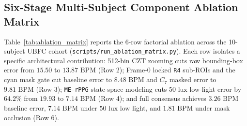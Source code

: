 \documentclass[conference]{IEEEtran}
\begin{document}
\subsection{Six-Stage Multi-Subject Component Ablation Matrix}

Table~\ref{tab:ablation_matrix} reports the 6-row factorial ablation across the 10-subject UBFC cohort (\texttt{scripts/run\_ablation\_matrix.py}). Each row isolates a specific architectural contribution: 512-bin CZT zooming cuts raw bounding-box error from $15.50$ to $13.87\text{ BPM}$ (Row 2); Frame-0 locked \texttt{R4} sub-ROIs and the cyan mask gate cut baseline error to $8.48\text{ BPM}$ and $C_7$ masked error to $9.81\text{ BPM}$ (Row 3); \texttt{ME-rPPG} state-space modeling cuts $50\text{ lux}$ low-light error by $64.2\%$ from $19.93$ to $7.14\text{ BPM}$ (Row 4); and full consensus achieves $3.26\text{ BPM}$ baseline error, $7.14\text{ BPM}$ under $50\text{ lux}$ low light, and $1.81\text{ BPM}$ under mask occlusion (Row 6).
\end{document}
